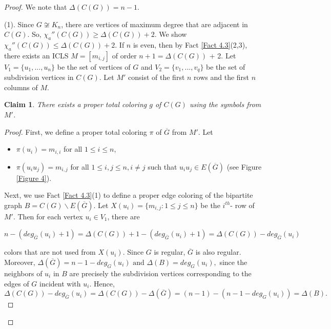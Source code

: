 \documentclass[12pt,reqno,a4paper]{amsart}
\theoremstyle{definition}
\theoremstyle{plain}
\newtheorem{claim}[defn]{Claim}
\begin{document}
\begin{proof}
We note that $\Delta(C(G))=n-1$. 

(1). 
Since $G\not\cong K_n$, there are vertices of maximum degree that are adjacent in $C(G)$.
So, $\chi_{a}''(C(G))\geq\Delta(C(G))+2$.
We show $\chi_{a}''(C(G))\leq\Delta(C(G))+2$.
If $n$ is even, then by Fact \ref{Fact 4.3}(2,3), there exists an ICLS $M = [m_{i,j}]$ of order $n+1=\Delta(C(G))$ + 2.
Let $V_{1}=\{u_{1},...,u_{n}\}$ be the set of vertices of $G$ and $V_{2}=\{v_{1},..., v_{q}\}$ be the set of subdivision vertices in $C(G)$.
Let $M'$ consist of the first $n$ rows and the first $n$ columns of $M$.


\begin{claim}\label{Claim 4.10}
There exists a proper total coloring $g$ of $C(G)$ using the symbols from $M'$.
\end{claim}
  
\begin{proof}
First, we define a proper total coloring $\pi$ of $\overline{G}$ from $M'$. 
Let
\begin{itemize}
    \item $\pi(u_i) = m_{i,i}$ for all $1 \le i \le n$, 
    \vspace{2mm}
    
    \item $\pi(u_iu_j) = m_{i,j}$ for all $1 \leq i, j \leq n, i \neq j$ 
such that $u_iu_j \in E(\overline{G})$ (see Figure \ref{Figure 4}).
\end{itemize}
Next, we use Fact \ref{Fact 4.3}(1) 
to define a proper edge coloring
of the bipartite graph $B = C(G) \backslash E(\overline{G})$.
Let $X(u_{i})=\{m_{i,j}:1\leq j\leq n\}$ be the $i^{th}$- row of $M'$. Then for each vertex $u_{i}\in V_{1}$, there are 
\begin{center}
$n-(deg_{\overline{G}}(u_{i})+1)= \Delta(C(G))+ 1 - (deg_{\overline{G}}(u_{i})+1)=\Delta(C(G)) - deg_{\overline{G}}(u_{i})$ 
\end{center}
colors that are not used from $X(u_{i})$.
Since $G$ is regular, $\overline{G}$ is also regular. 
Moreover,
$
\Delta(\overline{G})=n-1-deg_G(u_i)
\text{ and }
\Delta(B)=deg_G(u_i),
$
since the neighbors of $u_i$ in $B$ are precisely the subdivision vertices corresponding to the edges of $G$ incident with $u_i$. Hence,
\[
\Delta(C(G)) - deg_{\overline{G}}(u_{i})
=\Delta(C(G))-\Delta(\overline{G})
=(n-1)-(n-1-deg_G(u_i))
=\Delta(B).
\]



\end{proof}
\end{proof}
\end{document}
